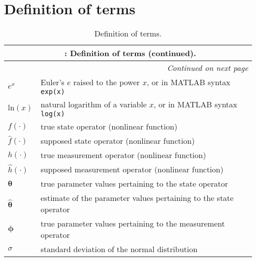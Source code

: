 \chapter{Definition of terms}
\label{ch:definition-of-terms}

\vspace{2em}
\begin{center}
\begin{longtable}{lp{10cm}}
\caption{Definition of terms.}\\
\endfirsthead
\multicolumn{2}{c}{\captionlabelfont\captionfont\tablename\  \thetable{}: \rmfamily Definition of terms (continued).} \\
\endhead
\multicolumn{2}{r}{\textit{Continued on next page}} \\
\endfoot
\endlastfoot
$e^x$&Euler's $e$ raised to the power $x$, or in MATLAB syntax \texttt{exp(x)}\\
$\mathrm{ln}(x)$&natural logarithm of a variable $x$, or in MATLAB syntax \texttt{log(x)}\\
$f(\cdot{})$&true state operator (nonlinear function)\\
$\hat{f}(\cdot{})$&supposed state operator (nonlinear function)\\
$h(\cdot{})$&true measurement operator (nonlinear function)\\
$\hat{h}(\cdot{})$&supposed measurement operator (nonlinear function)\\
$\boldsymbol\theta$&true parameter values pertaining to the state operator\\
$\hat{\boldsymbol\theta}$&estimate of the parameter values pertaining to the state operator\\
$\boldsymbol\phi$&true parameter values pertaining to the measurement operator\\
$\sigma$&standard deviation of the normal distribution\\

\end{longtable}
\end{center}
